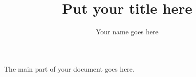 \documentclass[12pt]{article}
\begin{document}
\title{Put your title here}
\author{Your name goes here}
\date{}  %
\maketitle

The main part of your document goes here.
\end{document}
